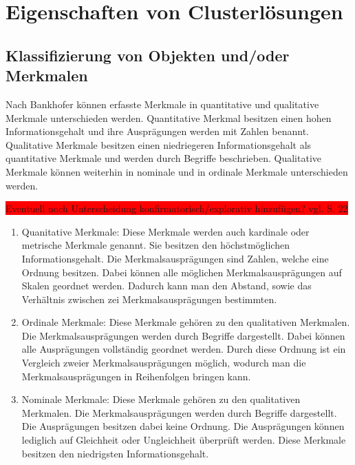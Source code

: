 \chapter{Eigenschaften von Clusterlösungen}

\section{Klassifizierung von Objekten und/oder Merkmalen}
Nach Bankhofer \cite{Bankhofer.2008} können erfasste Merkmale in quantitative und qualitative Merkmale unterschieden werden.
Quantitative Merkmal besitzen einen hohen Informationsgehalt und ihre Ausprägungen werden mit Zahlen benannt. Qualitative Merkmale besitzen einen niedriegeren Informationsgehalt als quantitative Merkmale und werden durch Begriffe beschrieben. Qualitative Merkmale können weiterhin in nominale und in ordinale Merkmale unterschieden werden.

\colorbox{red}{Eventuell noch Unterscheidung konfirmatorisch/explorativ hinzufügen? vgl. \cite{Bacher.2010} S. 22}

\begin{enumerate}
        \item Quanitative Merkmale: Diese Merkmale werden auch kardinale oder metrische Merkmale genannt. Sie besitzen den höchstmöglichen Informationsgehalt. Die Merkmalsausprägungen sind Zahlen, welche eine Ordnung besitzen. Dabei können alle möglichen Merkmalsausprägungen auf Skalen geordnet werden. Dadurch kann man den Abstand, sowie das Verhältnis zwischen zei Merkmalsausprägungen bestimmten.
        \item Ordinale Merkmale: Diese Merkmale gehören zu den qualitativen Merkmalen. Die Merkmalsausprägungen werden durch Begriffe dargestellt. Dabei können alle Ausprägungen vollständig geordnet werden. Durch diese Ordnung ist ein Vergleich zweier Merkmalsausprägungen möglich, wodurch man die Merkmalsausprägungen in Reihenfolgen bringen kann.
        \item Nominale Merkmale: Diese Merkmale gehören zu den qualitativen Merkmalen. Die Merkmalsausprägungen werden durch Begriffe dargestellt. Die Ausprägungen besitzen dabei keine Ordnung. Die Ausprägungen können lediglich auf Gleichheit oder Ungleichheit überprüft werden. Diese Merkmale besitzen den niedrigsten Informationsgehalt.
\end{enumerate}

